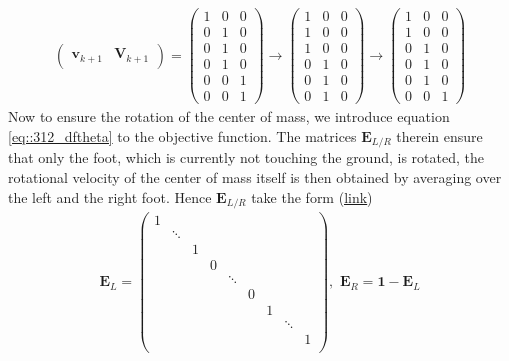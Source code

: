 \begin{align}
	\left(
	\begin{array}{c|c}
	\bm{v}_{k+1} & \bm{V}_{k+1}
	\end{array} 
	\right) =
	\left(
	\begin{array}{c|cc}
	1 & 0 & 0 \\
	0 & 1 & 0 \\
	0 & 1 & 0 \\ 
	0 & 1 & 0 \\
	0 & 0 & 1 \\
	0 & 0 & 1
	\end{array}\right) \rightarrow
	\left(
	\begin{array}{c|cc}
	1 & 0 & 0 \\
	1 & 0 & 0 \\
	1 & 0 & 0 \\ 
	0 & 1 & 0 \\
	0 & 1 & 0 \\
	0 & 1 & 0
	\end{array}\right) \rightarrow
	\left(
	\begin{array}{c|cc}
	1 & 0 & 0 \\
	1 & 0 & 0 \\
	0 & 1 & 0 \\ 
	0 & 1 & 0 \\
	0 & 1 & 0 \\
	0 & 0 & 1
	\end{array}\right)
\end{align}
Now to ensure the rotation of the center of mass, we introduce equation \ref{eq::312_dftheta} to the objective function. The matrices $\bm{E}_{L/R}$ therein ensure that only the foot, which is currently not touching the ground, is rotated, the rotational velocity of the center of mass itself is then obtained by averaging over the left and the right foot. Hence $\bm{E}_{L/R}$ take the form (\href{https://github.com/mhubii/nmpc_pattern_generator/blob/5a213044c927dc6aac9f7e32ce1e5fb472cd67bb/libs/pattern_generator/src/base_generator.cpp#L1281}{\underline{link}})
\begin{align}
	\bm{E}_L = \begin{pmatrix}
	1&&&&&&&& \\
	&\ddots&&&&&&& \\
	&&1&&&&&& \\
	&&&0&&&&& \\
	&&&&\ddots&&&& \\
	&&&&&0&&& \\
	&&&&&&1&& \\
	&&&&&&&\ddots& \\
	&&&&&&&&1 \\
	\end{pmatrix},\,\,
	\bm{E}_R = \bm{1} - \bm{E}_L
\end{align}
